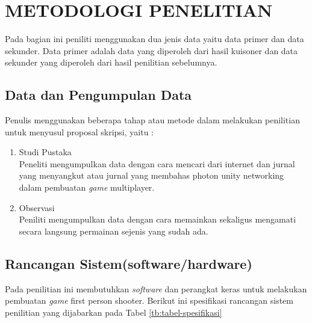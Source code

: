 \chapter{METODOLOGI PENELITIAN}
\noindent

Pada bagian ini peniliti menggunakan dua jenis data yaitu data primer dan data sekunder. Data primer adalah data yang diperoleh dari hasil kuisoner dan data sekunder yang diperoleh dari hasil penilitian sebelumnya.

\section{Data dan Pengumpulan Data}
\noindent

Penulis menggunakan beberapa tahap atau metode dalam melakukan penilitian untuk menyusul proposal skripsi, yaitu :

\begin{enumerate}
    \item Studi Pustaka \\ Peneliti mengumpulkan data dengan cara mencari dari internet dan jurnal yang menyangkut atau jurnal yang membahas photon unity networking dalam pembuatan \textit{game} multiplayer.
    \item Observasi \\ Peniliti mengumpulkan data dengan cara memainkan sekaligus mengamati secara langsung permainan sejenis yang sudah ada.
\end{enumerate}

\section{Rancangan Sistem(software/hardware)}
\noindent

    Pada penilitian ini membutuhkan \textit{software} dan perangkat keras untuk melakukan pembuatan \textit{game} first person shooter. Berikut ini spesifikasi rancangan sistem penilitian yang dijabarkan pada Tabel \ref{tb:tabel-spesifikasi}
    
